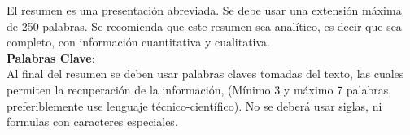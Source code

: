 El resumen es una presentación abreviada. Se debe usar una extensión máxima de 250 palabras. Se recomienda que este resumen sea analítico, es decir que sea completo, con información cuantitativa y cualitativa.\\

\noindent \textbf{Palabras Clave}:\\
Al final del resumen se deben usar palabras claves tomadas del texto, las cuales permiten la recuperación de la información, (Mínimo 3 y máximo 7 palabras, preferiblemente use lenguaje técnico-científico). No se deberá usar siglas, ni formulas con caracteres especiales.